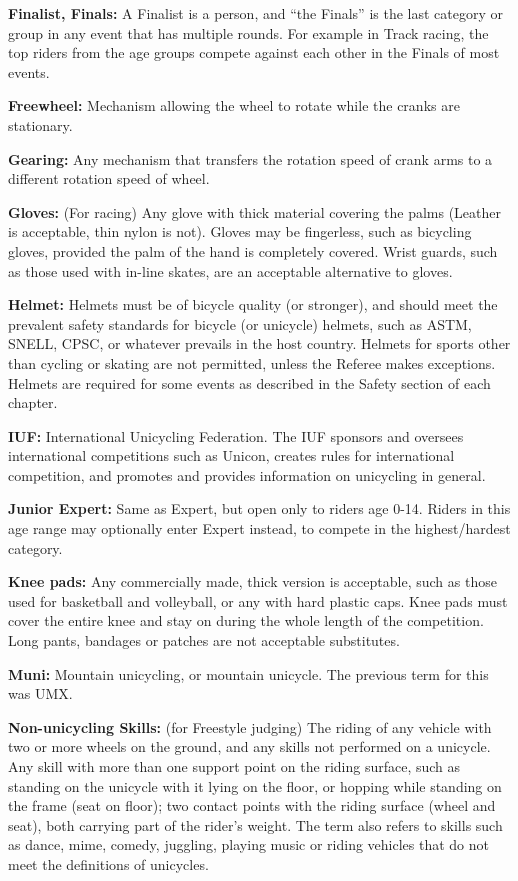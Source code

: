 \textbf{Finalist, Finals:} A Finalist is a person, and ``the Finals'' is the last category or group in any event that has multiple rounds.
For example in Track racing, the top riders from the age groups compete against each other in the Finals of most events.

\textbf{Freewheel:} Mechanism allowing the wheel to rotate while the cranks are stationary.

\textbf{Gearing:} Any mechanism that transfers the rotation speed of crank arms to a different rotation speed of wheel.

\textbf{Gloves:} (For racing) Any glove with thick material covering the palms (Leather is acceptable, thin nylon is not).
Gloves may be fingerless, such as bicycling gloves, provided the palm of the hand is completely covered.
Wrist guards, such as those used with in-line skates, are an acceptable alternative to gloves.

\textbf{Helmet:} Helmets must be of bicycle quality (or stronger), and should meet the prevalent safety standards for bicycle (or unicycle) helmets, such as ASTM, SNELL, CPSC, or whatever prevails in the host country.
Helmets for sports other than cycling or skating are not permitted, unless the Referee makes exceptions.
Helmets are required for some events as described in the Safety section of each chapter.

\textbf{IUF:} International Unicycling Federation.
The IUF sponsors and oversees international competitions such as Unicon, creates rules for international competition, and promotes and provides information on unicycling in general.

\textbf{Junior Expert:} Same as Expert, but open only to riders age 0-14.
Riders in this age range may optionally enter Expert instead, to compete in the highest/hardest category.

\textbf{Knee pads:} Any commercially made, thick version is acceptable, such as those used for basketball and volleyball, or any with hard plastic caps.
Knee pads must cover the entire knee and stay on during the whole length of the competition.
Long pants, bandages or patches are not acceptable substitutes.

\textbf{Muni:} Mountain unicycling, or mountain unicycle.
The previous term for this was UMX.

\textbf{Non-unicycling Skills:} (for Freestyle judging) The riding of any vehicle with two or more wheels on the ground, and any skills not performed on a unicycle.
Any skill with more than one support point on the riding surface, such as standing on the unicycle with it lying on the floor, or hopping while standing on the frame (seat on floor); two contact points with the riding surface (wheel and seat), both carrying part of the rider's weight.
The term also refers to skills such as dance, mime, comedy, juggling, playing music or riding vehicles that do not meet the definitions of unicycles.

